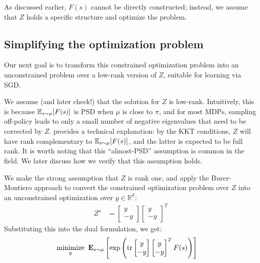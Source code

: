 As discussed earlier, $F(s)$ cannot be directly constructed; instead, we assume that $Z$ holds a specific structure and optimize the problem.


\subsection{Simplifying the optimization problem}

Our next goal is to transform this constrained optimization problem into an unconstrained problem over a low-rank version of $Z$, suitable for learning via SGD.

We assume (and later check!) that the solution for $Z$ is low-rank. Intuitively, this is because $\mathbb{E}_{s\sim\mu}[F(s)]$ is PSD when $\mu$ is close to $\pi$, and for most MDPs, sampling off-policy leads to only a small number of negative eigenvalues that need to be corrected by $Z$. \citet{kolter2011fixed} provides a technical explanation: by the KKT conditions, $Z$ will have rank complementary to $\mathbb{E}_{s\sim\mu}[F(s)]$, and the latter is expected to be full rank. It is worth noting that this ``almost-PSD'' assumption is common in the field. We later discuss how we verify that this assumption holds.

We make the strong assumption that $Z$ is rank one, and apply the Burer-Montiero approach \citep{burer2003nonlinear} to convert the constrained optimization problem over $Z$ into an unconstrained optimization over $y\in \mathbb R^{k}$:
\begin{align}
  Z^\star & = \begin{bmatrix} y \\ -y \end{bmatrix} \begin{bmatrix} y \\ -y\end{bmatrix}^T
\end{align}
Substituting this into the dual formulation, we get:
\begin{align}
  \underset{y}{\text{minimize}} & \;\; \mathbf{E}_{s\sim\mu} \left [ \exp\left (\text{tr}  \begin{bmatrix} y \\ -y \end{bmatrix} \begin{bmatrix} y \\ -y\end{bmatrix}^T F(s) \right )  \right ]
\end{align}

